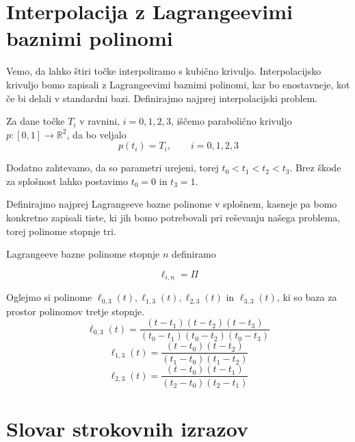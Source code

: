 \documentclass[mat1]{fmfdelo}
\newcommand{\R}{\mathbb R}
\begin{document}
\section{Interpolacija z Lagrangeevimi baznimi polinomi}

Vemo, da lahko štiri točke interpoliramo s kubično krivuljo. Interpolacijsko krivuljo bomo zapisali z Lagrangeevimi baznimi polinomi, kar bo enostavneje, kot če bi delali v standardni bazi. Definirajmo najprej interpolacijski problem.

Za dane točke $T_i$ v ravnini, $i = 0, 1, 2, 3$, iščemo parabolično krivuljo $p : [ 0, 1 ] \rightarrow \R^2$, da bo veljalo $$p(t_i) = T_i, \qquad i = 0, 1, 2, 3$$ 

Dodatno zahtevamo, da so parametri urejeni, torej $t_0 < t_1 < t_2 < t_3$. Brez škode za splošnost lahko postavimo $t_0 = 0$ in $t_3 = 1$.

Definirajmo najprej Lagrangeeve bazne polinome v splošnem, kasneje pa bomo konkretno zapisali tiste, ki jih bomo potrebovali pri reševanju našega problema, torej polinome stopnje tri.


\begin{definicija}
Lagrangeeve bazne polinome stopnje $n$ definiramo

$$ \ell_{i,n} = \Pi $$	
\end{definicija}


Oglejmo si polinome $ \ell_{0,3}(t), \ell_{1,3}(t), \ell_{2,3}(t)$ in $ \ell_{3,3}(t) $, ki so baza za prostor polinomov tretje stopnje.
	$$ \ell_{0,3}(t) =  \frac{(t - t_1)(t - t_2)(t - t_3)}{(t_0 - t_1)(t_0 - t_2)(t_0 - t_3)} $$
	$$ \ell_{1,3}(t) =  \frac{(t - t_0)(t - t_2)}{(t_1 - t_0)(t_1 - t_2)} $$
	$$ \ell_{2,3}(t) =  \frac{(t - t_0)(t - t_1)}{(t_2 - t_0)(t_2 - t_1)} $$


\section*{Slovar strokovnih izrazov}

\geslo{}{}
\geslo{}{}


\begin{thebibliography}{99}


\end{thebibliography}
\end{document}
